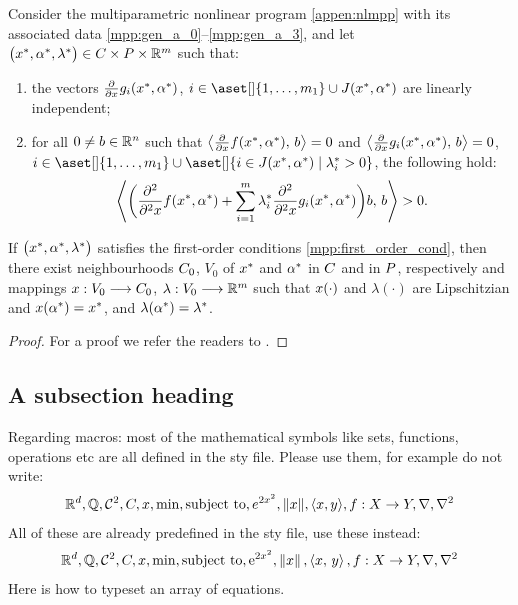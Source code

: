 \documentclass[11pt]{report}
\begin{document}
\begin{theorem}\label{ThmNeat}
Consider the multiparametric nonlinear program \eqref{appen:nlmpp} with its associated data \eqref{mpp:gen_a_0}--\eqref{mpp:gen_a_3}, and let \(\bigl( x^\ast,\alpha^\ast,\lambda^\ast \bigr) \in C \times P \times \mathbb{R}^m\) such that: 
\begin{enumerate}[label=\(\circ\), leftmargin=*, widest=b, align=left]
\item \label{mpp:reg:thrm:c1} the vectors \(\frac{\partial}{\partial x} g_i( x^\ast,\alpha^\ast)\), \(i \in \aset[]{1,\ldots,m_1} \cup J( \dcv\as,\param\as)\) are linearly independent; 
\item \label{mpp:reg:thrm:c2} for all \(0 \neq b \in \mathbb{R}^n\) such that \(\left\langle{\frac{\partial}{\partial x} f (\ensuremath{x}\ensuremath{^\ast},\ensuremath{\alpha}\ensuremath{^\ast})},\,{b}\right\rangle=0\) and \(\left\langle{\frac{\partial}{\partial x} g_i(\ensuremath{x}\ensuremath{^\ast},\ensuremath{\alpha}\ensuremath{^\ast})},\,{b}\right\rangle=0\), \(i \in \aset[]{1,\ldots,m_1}\cup \aset[]{i \in J(\dcv\as,\param\as)\mid \lambda_i\as>0}\), the following hold:
\begin{align}
    \left\langle{ \biggl( \frac{\partial^2}{\partial^2 x}f(\ensuremath{x}\ensuremath{^\ast},\ensuremath{\alpha}\ensuremath{^\ast})+\sum_{i=1}^{m} \lambda_i\ensuremath{^\ast}\frac{\partial^2}{\partial^2 x}g_i(\ensuremath{x}\ensuremath{^\ast},\ensuremath{\alpha}\ensuremath{^\ast})\biggr)b },\,{b}\right\rangle>0. \nonumber
\end{align}
\end{enumerate}
If \(\bigl( x^\ast,\alpha^\ast,\lambda^\ast\bigr)\) satisfies the first-order conditions \eqref{mpp:first_order_cond}, then there exist neighbourhoods \(C_0\), \(V_0\) of \(x^\ast\) and \(\alpha^\ast\) in \(C\) and in \(P\), respectively and mappings \(x:V_0 \longrightarrow C_0\), \(\lambda:V_0 \longrightarrow \mathbb{R}^m\) such that \(x(\cdot)\) and \(\lambda(\cdot)\) are Lipschitzian and \(x(\alpha^\ast)=x^\ast\), and \(\lambda(\alpha^\ast)= \lambda^\ast\).
\end{theorem}

\begin{proof}
For a proof we refer the readers to \cite[Corollary 2.3]{ref:cornet1986lipschitzian}.
\end{proof}


\subsection{A subsection heading}

Regarding macros: most of the mathematical symbols like sets, functions, operations etc are all defined in the sty file. Please use them, for example do not write:
\begin{align}
\mathbb{R}^d, \mathbb{Q}, \mathcal{C}^2, C, x, \text{min}, \text{subject to}, e^{2x^2}, \| x\|, \langle x, y \rangle, f: X \rightarrow Y, \nabla, \nabla^2 \nonumber 
\end{align}
All of these are already predefined in the sty file, use these instead:
\begin{align}
\mathbb{R}^d, \mathbb{Q}, \mathcal{C}^{2}, C, x, \operatorname*{min}, \operatorname{subject\,\,to}, \mathrm{e}^{2x^2}, \left\lVert x \right\rVert, \left\langle{x},\,{y}\right\rangle, f:X \rightarrow Y, \nabla, \nabla^2 \nonumber 
\end{align}
Here is how to typeset an array of equations.
\end{document}
